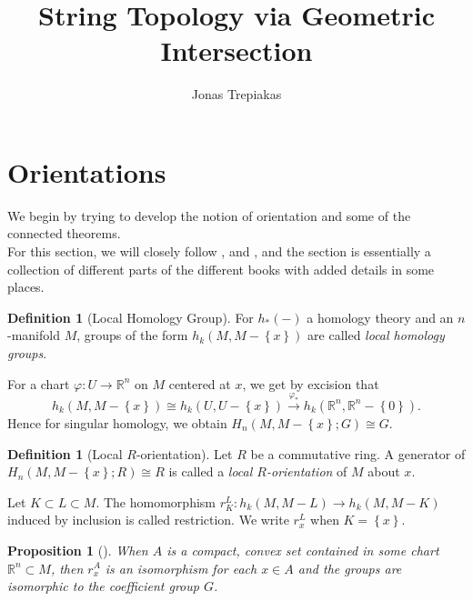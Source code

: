 \documentclass[reqno]{amsart}
\title{String Topology via Geometric Intersection}
\author{Jonas Trepiakas}
\date{}
\newtheorem{proposition}[theorem]{Proposition}
\theoremstyle{definition}
\newtheorem{definition}[theorem]{Definition}
\theoremstyle{remark}
\begin{document}
\maketitle

\tableofcontents

\newpage

\section{Orientations}

We begin by trying to develop the notion of orientation and some of the
connected
theorems.\\
\linebreak
For this section, we will closely follow 
\cite{Bredon}, \cite{Dieck} and \cite{Dold}, and the section is
essentially a collection of different parts of the different books with
added details in some places.

\begin{definition}[Local Homology Group]
    For $h_*(-)$ a homology theory
    and an $n$-manifold $M$, groups of the form
    $h_k(M , M-\left\{ x \right\} )$ are called
    \textit{local homology groups}.
\end{definition}

For a chart $\varphi  \colon U \to \mathbb{R}^{n}$ 
on $M$ centered at $x$, we get by excision that
\[
h_k(M, M-\left\{ x \right\} ) 
\cong h_k\left( U, U- \left\{ x \right\}  \right) 
\stackrel{\varphi_*}{\to} h_k\left( \mathbb{R}^{n},
\mathbb{R}^{n} - \left\{ 0 \right\} \right) .
\] 
Hence for singular homology, we obtain
$H_n\left( M, M - \left\{ x \right\} ; G \right) 
\cong G$.


\begin{definition}[Local $R$-orientation]
    Let $R$ be a commutative ring.
    A generator of
    $H_n\left( M, M - \left\{ x \right\} ; R \right) 
    \cong R$ is called a 
    \textit{local $R$-orientation} of $M$ about $x$.
\end{definition}

Let $K \subset L \subset M$. The homomorphism
$r_{K}^{L} \colon h_k (M, M-L) \to 
h_k(M, M-K)$ induced by inclusion is
called restriction. We write
$r_{x}^{L}$ when $K = \left\{ x \right\} $.

\begin{proposition}[]\label{Prop:SIDJAV}
    When $A$ is a compact, convex set contained
    in some chart $\mathbb{R}^{n} \subset M$, then
    $r_{x}^{A}$ is an isomorphism for each
    $x \in A$ and the
    groups are isomorphic to the coefficient group
    $G$.
\end{proposition}
\end{document}
